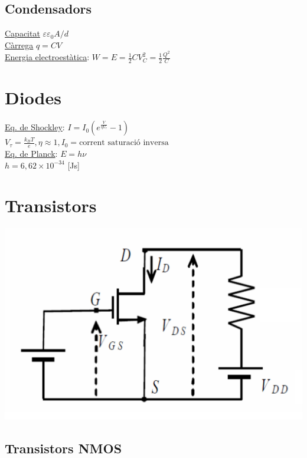 \documentclass[12pt]{article}
\begin{document}
\raggedright
\begin{multicols}{4}

\subsection{Condensadors}

\underline{Capacitat} $\varepsilon \varepsilon_0 A / d$ \\
\underline{Càrrega} $q = CV$ \\
\underline{Energia electroestàtica}: $W = E = \frac{1}{2}CV_C^2 = \frac{1}{2}\frac{Q^2}{C}$

\section{Diodes}

\underline{Eq. de Shockley}: $I = I_0 \left( e^{\frac{V}{\eta V_\tau}} -1 \right)$ \\
$V_\tau = \frac{k_BT}{e}, \eta \approx 1, I_0 = \text{corrent saturació inversa}$ \\
\underline{Eq. de Planck}: $E = h \nu$ \\
$h = 6,62 \times 10^{-34}$ [Js]

\section{Transistors}

\includegraphics[width=\linewidth]{Auxiliar/Figura1.pdf}

\subsection{Transistors NMOS}


\end{multicols}
\end{document}
